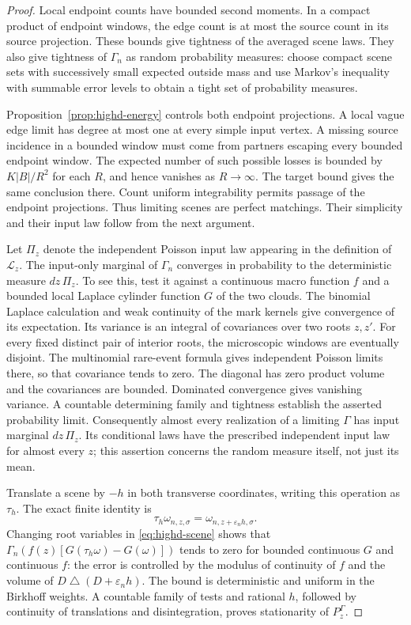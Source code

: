 \documentclass[11pt,reqno]{amsart}
\theoremstyle{definition}
\theoremstyle{remark}
\numberwithin{equation}{section}
\begin{document}
\begin{proof}
Local endpoint counts have bounded second moments. In a compact
product of endpoint windows, the edge count is at most the source
count in its source projection. These bounds give tightness of the
averaged scene laws. They also give tightness of \(\Gamma_n\) as
random probability measures: choose compact scene sets with successively
small expected outside mass and use Markov's inequality with summable
error levels to obtain a tight set of probability measures.

Proposition~\ref{prop:highd-energy} controls both endpoint projections.
A local vague edge limit has degree at most one at every simple input
vertex. A missing source incidence in a bounded window must come from
partners escaping every bounded endpoint window. The expected number
of such possible losses is bounded by \(K|B|/R^2\) for each \(R\),
and hence vanishes as \(R\to\infty\). The target bound gives the
same conclusion there. Count uniform integrability permits passage of
the endpoint projections. Thus limiting scenes are perfect matchings.
Their simplicity and their input law follow from the next argument.

Let \(\Pi_z\) denote the independent Poisson input law appearing
in the definition of \(\mathcal L_z\). The input-only marginal of
\(\Gamma_n\) converges in probability to the deterministic measure
\(dz\,\Pi_z\). To see this, test it against a continuous macro
function \(f\) and a bounded local Laplace cylinder function \(G\)
of the two clouds. The binomial Laplace calculation and weak continuity
of the mark kernels give convergence of its expectation. Its variance
is an integral of covariances over two roots \(z,z'\).
For every fixed distinct pair of interior roots, the microscopic
windows are eventually disjoint. The multinomial rare-event formula
gives independent Poisson limits there, so that covariance tends to
zero. The diagonal has zero product volume and the covariances are
bounded. Dominated convergence gives vanishing variance.
A countable determining family and tightness establish the asserted
probability limit. Consequently almost every realization of a limiting
\(\Gamma\) has input marginal \(dz\,\Pi_z\). Its conditional laws
have the prescribed independent input law for almost every \(z\);
this assertion concerns the random measure itself, not just its mean.

Translate a scene by \(-h\) in both transverse coordinates, writing
this operation as \(\tau_h\). The exact finite identity is
\[
\tau_h\omega_{n,z,\sigma}
 =\omega_{n,z+\varepsilon_nh,\sigma}.
\]
Changing root variables in \eqref{eq:highd-scene} shows that
\(\Gamma_n(f(z)[G(\tau_h\omega)-G(\omega)])\) tends to zero
for bounded continuous \(G\) and continuous \(f\): the error is
controlled by the modulus of continuity of \(f\) and the volume
of \(D\mathbin\triangle(D+\varepsilon_nh)\).
The bound is deterministic and uniform in the Birkhoff weights.
A countable family of tests and rational \(h\), followed by
continuity of translations and disintegration, proves stationarity
of \(P_z^\Gamma\).


\end{proof}
\end{document}
